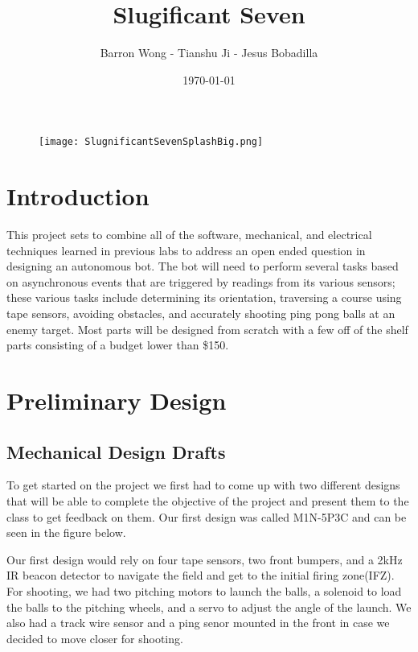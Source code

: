 \documentclass{article}
\title{Slugificant Seven}
\author{Barron Wong - Tianshu Ji - Jesus Bobadilla }
\date{\today}
\begin{document}
\maketitle

\begin{figure}[H]
    \centering
    \texttt{[image: SlugnificantSevenSplashBig.png]}
\end{figure}

\newpage
\tableofcontents
\newpage

\section*{Introduction}
\doublespacing
This project sets to combine all of the software, mechanical, and electrical techniques learned in previous labs to address an open ended question in designing an autonomous bot. The bot will need to perform several tasks based on asynchronous events that are triggered by readings from its various sensors; these various tasks include determining its orientation, traversing a course using tape sensors, avoiding obstacles, and accurately shooting ping pong balls at an enemy target.  Most parts will be designed from scratch with a few off of the shelf parts consisting of a budget lower than \$150.


\section{Preliminary Design} 
\doublespacing

\subsection{Mechanical Design Drafts}
To get started on the project we first had to come up with two different designs that will be able to complete the objective of the project and present them to the class to get feedback on them.  Our first design was called M1N-5P3C and can be seen in the figure below.


Our first design would rely on four tape sensors, two front bumpers, and a 2kHz IR beacon detector to navigate the field and get to the initial firing zone(IFZ).  For shooting, we had two pitching motors to launch the balls, a solenoid to load the balls to the pitching wheels, and a servo to adjust the angle of the launch.  We also had a track wire sensor and a ping senor mounted in the front in case we decided to move closer for shooting.  
\end{document}
